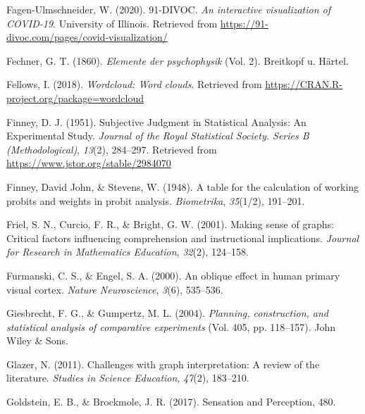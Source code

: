 \documentclass[print]{nuthesis}
\newlength{\cslhangindent}
\newenvironment{CSLReferences}%
{\setlength{\parindent}{0pt}%
\everypar{\setlength{\hangindent}{\cslhangindent}}\ignorespaces}%
{\par}
\begin{document}
\begin{CSLReferences}{1}{0}
\leavevmode{}%
Fagen-Ulmschneider, W. (2020). 91-DIVOC. \emph{An interactive visualization of COVID-19}. University of Illinois. Retrieved from \url{https://91-divoc.com/pages/covid-visualization/}

\leavevmode{}%
Fechner, G. T. (1860). \emph{Elemente der psychophysik} (Vol. 2). Breitkopf u. H{ä}rtel.

\leavevmode{}%
Fellows, I. (2018). \emph{Wordcloud: Word clouds}. Retrieved from \url{https://CRAN.R-project.org/package=wordcloud}

\leavevmode{}%
Finney, D. J. (1951). Subjective {Judgment} in {Statistical} {Analysis}: {An} {Experimental} {Study}. \emph{Journal of the Royal Statistical Society. Series B (Methodological)}, \emph{13}(2), 284--297. Retrieved from \url{https://www.jstor.org/stable/2984070}

\leavevmode{}%
Finney, David John, \& Stevens, W. (1948). A table for the calculation of working probits and weights in probit analysis. \emph{Biometrika}, \emph{35}(1/2), 191--201.

\leavevmode{}%
Friel, S. N., Curcio, F. R., \& Bright, G. W. (2001). Making sense of graphs: Critical factors influencing comprehension and instructional implications. \emph{Journal for Research in Mathematics Education}, \emph{32}(2), 124--158.

\leavevmode{}%
Furmanski, C. S., \& Engel, S. A. (2000). An oblique effect in human primary visual cortex. \emph{Nature Neuroscience}, \emph{3}(6), 535--536.

\leavevmode{}%
Giesbrecht, F. G., \& Gumpertz, M. L. (2004). \emph{Planning, construction, and statistical analysis of comparative experiments} (Vol. 405, pp. 118--157). John Wiley \& Sons.

\leavevmode{}%
Glazer, N. (2011). Challenges with graph interpretation: A review of the literature. \emph{Studies in Science Education}, \emph{47}(2), 183--210.

\leavevmode{}%
Goldstein, E. B., \& Brockmole, J. R. (2017). Sensation and {Perception}, 480.


\end{CSLReferences}
\end{document}
